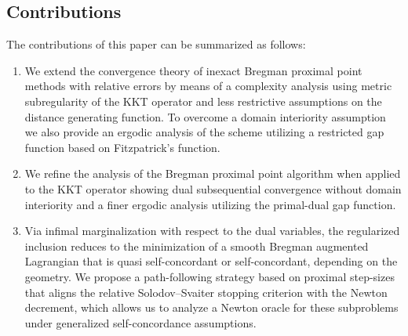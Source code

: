 \documentclass[11pt,onecolumn]{article}
\theoremstyle{remark}
\begin{document}
\subsection{Contributions}
The contributions of this paper can be summarized as follows:
\begin{enumerate}
    \item
    We extend the convergence theory of inexact Bregman proximal point methods with relative errors \cite{solodov2000inexact} by means of a complexity analysis using metric subregularity of the KKT operator and less restrictive assumptions on the distance generating function.
    To overcome a domain interiority assumption we also provide an ergodic analysis of the scheme utilizing a restricted gap function based on Fitzpatrick's function.

    \item 
    We refine the analysis of the Bregman proximal point algorithm when applied to the KKT operator showing dual subsequential convergence without domain interiority and a finer ergodic analysis utilizing the primal-dual gap function.

    \item
    Via infimal marginalization with respect to the dual variables, the regularized inclusion reduces to the minimization of a smooth Bregman augmented Lagrangian that is quasi self-concordant or self-concordant, depending on the geometry.
We propose a path-following strategy based on proximal step-sizes that aligns the relative Solodov--Svaiter stopping criterion with the Newton decrement, which allows us to analyze a Newton oracle for these subproblems under generalized self-concordance assumptions.
\end{enumerate}
\end{document}
